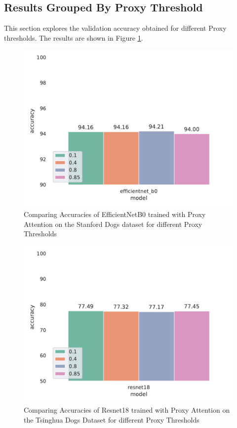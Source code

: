 \subsection{Results Grouped By Proxy Threshold}
This section explores the validation accuracy obtained for different Proxy thresholds. The results are shown in Figure \ref{fig:proxy_threshold}. 
\begin{figure}[H]
    \centering
    \includegraphics[width=1\textwidth]{results/proxy_threshold_results.pdf}
    \caption{Comparing Accuracies of EfficientNetB0 \cite{tanEfficientnetRethinkingModel2019} trained with Proxy Attention on the Stanford Dogs dataset\cite{khoslaNovelDatasetFineGrained} for different Proxy Thresholds}
    \label{fig:proxy_threshold}
\end{figure}

\begin{figure}[H]
    \centering
    \includegraphics[width=1\textwidth]{results/proxy_threshold_results_tsing.pdf}
    \caption{Comparing Accuracies of Resnet18 \cite{heDeepResidualLearning2016} trained with Proxy Attention on the Tsinghua Dogs Dataset \cite{zouNewDatasetDog2020} for different Proxy Thresholds}
    \label{fig:proxy_threshold2}
\end{figure}

